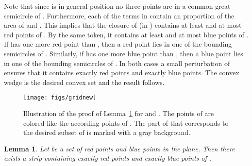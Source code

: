\documentclass{article}
\newtheorem{lemma}[theorem]{Lemma}
\def\QED{\ensuremath{{\square}}}
\def\markatright#1{\leavevmode\unskip\nobreak\quad\hspace*{\fill}{#1}}
\newenvironment{proof}
  {\begin{trivlist}\item[\hskip\labelsep{\bf Proof.}]}
  {\markatright{\QED}\end{trivlist}}
\begin{document}
\begin{proof}
Note that since   is in general position no three points  are in a
common great semicircle of . Furthermore, each of the terms in 
 contain an  proportion of the
area of  and . This implies that the closure of  (in )
contains at least   and at most
  red points of . By
the same token, it contains at least   and at most
  blue points of .
If  has one more red point than  ,
then a red point lies in one of the bounding semicircles of . Similarly, 
if  has one more blue point than  ,
then a blue point lies in one of the bounding semicircles of .
In both cases a small perturbation of  ensures that it
contains exactly  red points
and exactly  blue points.
The convex wedge  is the desired convex set
and the result follows.
\end{proof}


\begin{figure}
  	\begin{center}
   	\texttt{[image: figs/gridnew]}
	\end{center}
\caption{Illustration of the proof of Lemma~\ref{lem:n+1} for  and . 
	The points of  are colored like the according points of . 
	The part of  that corresponds to the desired subset of  is marked with a gray background.}
\label{fig:grid}
\end{figure}

\begin{lemma}\label{lem:n+1}
Let  be a set of  red points and  blue points in the plane. Then 
there exists a strip containing exactly  red points and exactly  blue points of .
\end{lemma}
\end{document}
